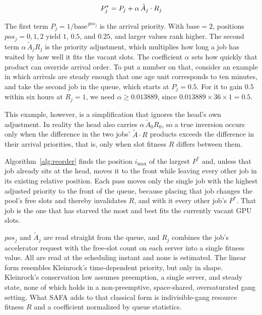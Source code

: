 \documentclass{ieeetj}
\begin{document}
\begin{equation}
P^*_j = P_j + \alpha\, \tilde A_j \cdot R_j
\label{eq:01}
\vspace{2pt}
\end{equation}

The first term $P_j=1/\text{base}^{\,pos_j}$ is the arrival priority. With $\text{base}=2$, positions $pos_j=0,1,2$ yield $1$, $0.5$, and $0.25$, and larger values rank higher. The second term $\alpha\,\tilde A_j R_j$ is the priority adjustment, which multiplies how long a job has waited by how well it fits the vacant slots. The coefficient $\alpha$ sets how quickly that product can override arrival order. To put a number on that, consider an example in which arrivals are steady enough that one age unit corresponds to ten minutes, and take the second job in the queue, which starts at $P_j=0.5$. For it to gain $0.5$ within six hours at $R_j=1$, we need $\alpha\ge0.013889$, since $0.013889\times36\times1=0.5$.

This example, however, is a simplification that ignores the head's own adjustment. In reality the head also carries $\alpha\,\tilde A_0 R_0$, so a true inversion occurs only when the difference in the two jobs' $\tilde A\cdot R$ products exceeds the difference in their arrival priorities, that is, only when slot fitness $R$ differs between them.

Algorithm~\ref{alg:reorder} finds the position $i_{\max}$ of the largest $P^*$ and, unless that job already sits at the head, moves it to the front while leaving every other job in its existing relative position. Each pass moves only the single job with the highest adjusted priority to the front of the queue, because placing that job changes the pool's free slots and thereby invalidates $R$, and with it every other job's $P^*$. That job is the one that has starved the most and best fits the currently vacant GPU slots.

$pos_j$ and $\tilde A_j$ are read straight from the queue, and $R_j$ combines the job's accelerator request with the free-slot count on each server into a single fitness value. All are read at the scheduling instant and none is estimated. The linear form resembles Kleinrock's time-dependent priority\cite{kleinrock1976queueing}, but only in shape. Kleinrock's conservation law assumes preemption, a single server, and steady state, none of which holds in a non-preemptive, space-shared, oversaturated gang setting. What SAFA adds to that classical form is indivisible-gang resource fitness $R$ and a coefficient normalized by queue statistics.
\end{document}
